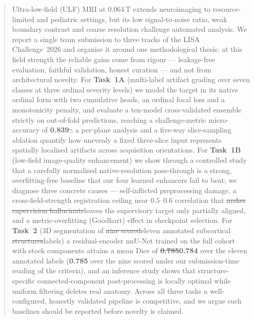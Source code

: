 \documentclass[runningheads]{llncs}
\newcommand{\addone}[1]{\textcolor{revone}{#1}}
\newcommand{\delone}[1]{\textcolor{revone}{\sout{#1}}}
\newcommand{\addtwo}[1]{\textcolor{revtwo}{#1}}
\newcommand{\deltwo}[1]{\textcolor{revtwo}{\sout{#1}}}
\newcommand{\addboth}[1]{\textcolor{revboth}{#1}}
\newcommand{\delboth}[1]{\textcolor{revboth}{\sout{#1}}}
\begin{document}
\begin{abstract}
Ultra-low-field (ULF) MRI at 0.064\,T extends neuroimaging to resource-limited
and pediatric settings, but its low signal-to-noise ratio, weak boundary
contrast and coarse resolution challenge automated analysis. We report a single
team submission to three tracks of the LISA Challenge~2026 and organise it around
one methodological thesis: at this field strength the reliable gains come from
rigour --- leakage-free evaluation, faithful validation, honest curation --- and
not from architectural novelty. For \textbf{Task~1A} (multi-label artifact
grading over seven classes at three ordinal severity levels) we model the target
in its native ordinal form with two cumulative heads, an ordinal focal loss and a
monotonicity penalty, and evaluate a ten-model cross-validated ensemble strictly
on out-of-fold predictions, reaching a challenge-metric micro-accuracy of
\textbf{0.839}\delboth{.}\addboth{; a per-plane analysis and a five-way
slice-sampling ablation quantify how unevenly a fixed three-slice input represents
spatially localised artifacts across acquisition orientations.} For \textbf{Task~1B} (low-field image-quality enhancement) we
show through a controlled study that a carefully normalised native-resolution
pass-through is a strong, overfitting-free baseline that our four learned
enhancers fail to beat; we diagnose three concrete causes --- self-inflicted
preprocessing damage, a cross-field-strength registration ceiling near
$0.5$--$0.6$ correlation that \deltwo{makes supervision hallucinate}\addtwo{leaves
the supervisory target only partially aligned}, and a
metric-overfitting (Goodhart) effect in checkpoint selection. For
\textbf{Task~2} (3D segmentation of \delone{nine scored}\addone{eleven
annotated} subcortical \delone{structures}\addone{labels}) a
residual-encoder nnU-Net trained on the full cohort with stock components attains
a mean Dice of \delone{\textbf{0.785}}\addone{\textbf{0.784} over the
eleven annotated labels (\textbf{0.785} over the nine scored under our
submission-time reading of the criteria)}, and an inference study shows that
structure-specific connected-component post-processing is locally optimal while
uniform filtering deletes real anatomy. Across all three tasks a well-configured,
honestly validated pipeline is competitive, and we argue such baselines should be
reported before novelty is claimed.
\end{abstract}
\end{document}
